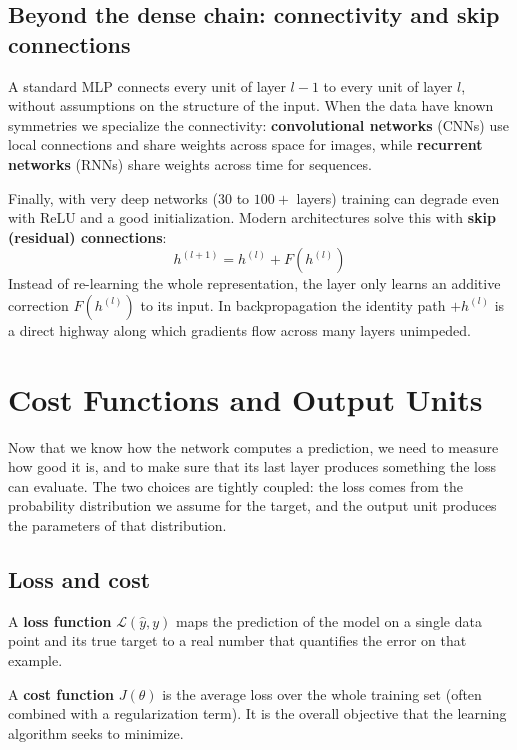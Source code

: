 \subsection{Beyond the dense chain: connectivity and skip connections}
A standard MLP connects every unit of layer $l-1$ to every unit of layer $l$,
without assumptions on the structure of the input. When the data have known
symmetries we specialize the connectivity: \textbf{convolutional networks} (CNNs)
use local connections and share weights across space for images, while
\textbf{recurrent networks} (RNNs) share weights across time for sequences.

Finally, with very deep networks ($30$ to $100+$ layers) training can degrade even
with ReLU and a good initialization. Modern architectures solve this with
\textbf{skip (residual) connections}:
\begin{equation}
    h^{(l+1)} = h^{(l)} + F(h^{(l)})
\end{equation}
Instead of re-learning the whole representation, the layer only learns an additive
correction $F(h^{(l)})$ to its input. In backpropagation the identity path
$+h^{(l)}$ is a direct highway along which gradients flow across many layers
unimpeded.

\section{Cost Functions and Output Units}
\label{sec:loss-output}
Now that we know how the network computes a prediction, we need to measure how good
it is, and to make sure that its last layer produces something the loss can
evaluate. The two choices are tightly coupled: the loss comes from the probability
distribution we assume for the target, and the output unit produces the parameters
of that distribution.

\subsection{Loss and cost}
\begin{definition}
    A \textbf{loss function} $\mathcal{L}(\hat{y}, y)$ maps the prediction of the
    model on a single data point and its true target to a real number that
    quantifies the error on that example.
\end{definition}
\begin{definition}
    A \textbf{cost function} $J(\theta)$ is the average loss over the whole
    training set (often combined with a regularization term). It is the overall
    objective that the learning algorithm seeks to minimize.
\end{definition}

